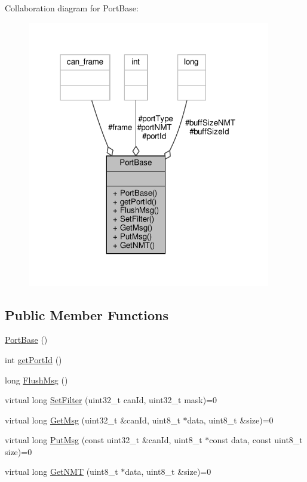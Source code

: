 Collaboration diagram for Port\+Base\+:
\nopagebreak
\begin{figure}[H]
\begin{center}
\leavevmode
\includegraphics[width=301pt]{classPortBase__coll__graph}
\end{center}
\end{figure}
\subsection*{Public Member Functions}
\begin{DoxyCompactItemize}
\item 
\hyperlink{classPortBase_acb7872550bc94538ef95d2510d763be3}{Port\+Base} ()
\item 
int \hyperlink{classPortBase_a45ec4a2cd5e17e098f6f72677437f066}{get\+Port\+Id} ()
\item 
long \hyperlink{classPortBase_a913932fc850e9aebc947542773c669ad}{Flush\+Msg} ()
\item 
virtual long \hyperlink{classPortBase_a1d857a81a8e3f3bd460ef7c802ee762c}{Set\+Filter} (uint32\+\_\+t can\+Id, uint32\+\_\+t mask)=0
\item 
virtual long \hyperlink{classPortBase_a4fe82768f2b79889d7084292ac0e8696}{Get\+Msg} (uint32\+\_\+t \&can\+Id, uint8\+\_\+t $\ast$data, uint8\+\_\+t \&size)=0
\item 
virtual long \hyperlink{classPortBase_a26213ebb6ea0a0b77f60c28944e3bb8e}{Put\+Msg} (const uint32\+\_\+t \&can\+Id, uint8\+\_\+t $\ast$const data, const uint8\+\_\+t size)=0
\item 
virtual long \hyperlink{classPortBase_abab2bf17b01d87c2bca01cb2151aa2f1}{Get\+N\+MT} (uint8\+\_\+t $\ast$data, uint8\+\_\+t \&size)=0
\end{DoxyCompactItemize}
